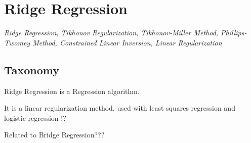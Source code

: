 
\section{Ridge Regression} 
\label{sec:ridge}

\emph{Ridge Regression, Tikhonov Regularization, Tikhonov-Miller Method, Phillips-Twomey Method, Constrained Linear Inversion, Linear Regularization}

\subsection{Taxonomy}
Ridge Regression is a Regression algorithm.

It is a linear regularization method.
used with least squares regression and logistic regression !?


Related to Bridge Regression??? 


